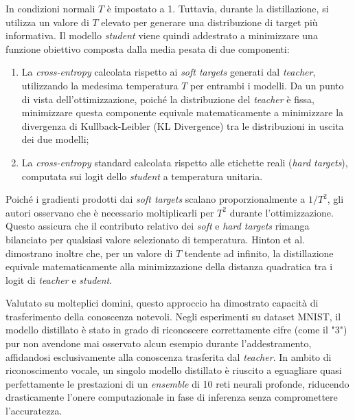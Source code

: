 In condizioni normali $T$ è impostato a 1. Tuttavia, durante la distillazione, si utilizza un valore di $T$ elevato per generare una distribuzione di target più informativa. Il modello \textit{student} viene quindi addestrato a minimizzare una funzione obiettivo composta dalla media pesata di due componenti:
\begin{enumerate}
    \item La \textit{cross-entropy} calcolata rispetto ai \textit{soft targets} generati
          dal \textit{teacher}, utilizzando la medesima temperatura $T$ per entrambi i
          modelli. Da un punto di vista dell'ottimizzazione, poiché la distribuzione del
          \textit{teacher} è fissa, minimizzare questa componente equivale
          matematicamente a minimizzare la divergenza di Kullback-Leibler (KL Divergence)
          tra le distribuzioni in uscita dei due modelli;
    \item La \textit{cross-entropy} standard calcolata rispetto alle etichette reali
          (\textit{hard targets}), computata sui logit dello \textit{student} a
          temperatura unitaria.
\end{enumerate}
Poiché i gradienti prodotti dai \textit{soft targets} scalano proporzionalmente a $1/T^2$, gli autori osservano che è necessario moltiplicarli per $T^2$ durante l'ottimizzazione. Questo assicura che il contributo relativo dei \textit{soft} e \textit{hard targets} rimanga bilanciato per qualsiasi valore selezionato di temperatura. Hinton et al. dimostrano inoltre che, per un valore di $T$ tendente ad infinito, la distillazione equivale matematicamente alla minimizzazione della distanza quadratica tra i logit di \textit{teacher} e \textit{student}. \par
Valutato su molteplici domini, questo approccio ha dimostrato capacità di
trasferimento della conoscenza notevoli. Negli esperimenti su dataset MNIST, il
modello distillato è stato in grado di riconoscere correttamente cifre (come il
"3") pur non avendone mai osservato alcun esempio durante l'addestramento,
affidandosi esclusivamente alla conoscenza trasferita dal \textit{teacher}. In
ambito di riconoscimento vocale, un singolo modello distillato è riuscito a
eguagliare quasi perfettamente le prestazioni di un \textit{ensemble} di 10
reti neurali profonde, riducendo drasticamente l'onere computazionale in fase
di inferenza senza compromettere l'accuratezza.

